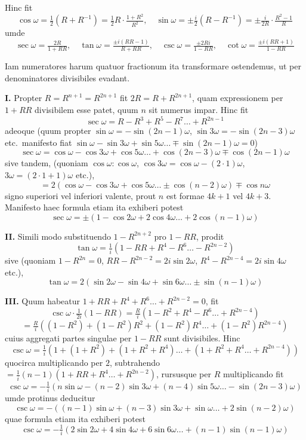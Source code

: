 \documentclass[12pt,a4paper]{article}
\theoremstyle{plain}
\theoremstyle{definition}
\theoremstyle{remark}
\begin{document}
Hinc fit
\[\cos\omega = \tfrac{1}{2}(R + R^{-1}) = \tfrac{1}{2}R \cdot \tfrac{1+R^2}{R^2}, \quad \sin\omega = \pm\tfrac{i}{2}(R - R^{-1}) = \pm\tfrac{i}{2R} \cdot \tfrac{R^2-1}{R}\]
umde
\[\sec\omega = \tfrac{2R}{1+RR}, \quad \tan\omega = \tfrac{\pm i(RR-1)}{R+RR}, \quad \csc\omega = \tfrac{\pm 2Ri}{1-RR}, \quad \cot\omega = \tfrac{\pm i(RR+1)}{1-RR}\]

Iam numeratores harum quatuor fractionum ita transformare ostendemus, ut per denominatores divisibiles evadant.

\textbf{I.} Propter $R = R^{n+1} = R^{2n+1}$ fit $2R = R + R^{2n+1}$, quam expressionem per $1+RR$ divisibilem esse patet, quum $n$ sit numerus impar. Hinc fit
\[\sec\omega = R - R^3 + R^5 - R^7 \ldots + R^{2n-1}\]
adeoque (quum propter $\sin\omega = -\sin(2n-1)\omega$, $\sin3\omega = -\sin(2n-3)\omega$ etc.\ manifesto fiat $\sin\omega - \sin3\omega + \sin5\omega \ldots \mp \sin(2n-1)\omega = 0$)
\[\sec\omega = \cos\omega - \cos3\omega + \cos5\omega \ldots + \cos(2n-3)\omega \mp \cos(2n-1)\omega\]
sive tandem, (quoniam $\cos\omega : \cos\omega$, $\cos3\omega = \cos\omega - (2\cdot1)\omega$, $3\omega = (2\cdot1+1)\omega$ etc.),
\[= 2(\cos\omega - \cos3\omega + \cos5\omega \ldots \pm \cos(n-2)\omega) \mp \cos n\omega\]
signo superiori vel inferiori valente, prout $n$ est formae $4k+1$ vel $4k+3$. Manifesto haec formula etiam ita exhiberi potest
\[\sec\omega = \pm(1 - \cos2\omega + 2\cos4\omega \ldots + 2\cos(n-1)\omega)\]

\textbf{II.} Simili modo substituendo $1 - R^{2n+2}$ pro $1 - RR$, prodit
\[\tan\omega = \tfrac{1}{i}(1 - RR + R^4 - R^6 \ldots - R^{2n-2})\]
sive (quoniam $1 - R^{2n} = 0$, $RR - R^{2n-2} = 2i\sin2\omega$, $R^4 - R^{2n-4} = 2i\sin4\omega$ etc.),
\[\tan\omega = 2(\sin2\omega - \sin4\omega + \sin6\omega \ldots \pm \sin(n-1)\omega)\]

\textbf{III.} Quum habeatur $1 + RR + R^4 + R^6 \ldots + R^{2n-2} = 0$, fit
\[\csc\omega \cdot \tfrac{1}{2i}(1-RR) = \tfrac{R}{i}(1 - R^2 + R^4 - R^6 \ldots + R^{2n-4})\]
\[= \tfrac{R}{i}((1-R^2) + (1-R^2)R^2 + (1-R^2)R^4 \ldots + (1-R^2)R^{2n-4})\]
cuius aggregati partes singulae per $1-RR$ sunt divisibiles. Hinc
\[\csc\omega = \tfrac{1}{i}(1 + (1+R^2) + (1+R^2+R^4) \ldots + (1+R^2+R^4 \ldots +R^{2n-4}))\]
quocirca multiplicando per $2$, subtrahendo $= \tfrac{1}{i}(n-1)(1+RR+R^4 \ldots + R^{2n-2})$, rursusque per $R$ multiplicando fit
\[\csc\omega = -\tfrac{1}{i}(n\sin\omega - (n-2)\sin3\omega + (n-4)\sin5\omega \ldots - \sin(2n-3)\omega)\]
umde protinus deducitur
\[\csc\omega = -((n-1)\sin\omega + (n-3)\sin3\omega + \sin\omega \ldots + 2\sin(n-2)\omega)\]
quae formula etiam ita exhiberi potest
\[\csc\omega = -\tfrac{1}{i}(2\sin2\omega + 4\sin4\omega + 6\sin6\omega \ldots + (n-1)\sin(n-1)\omega)\]
\end{document}
